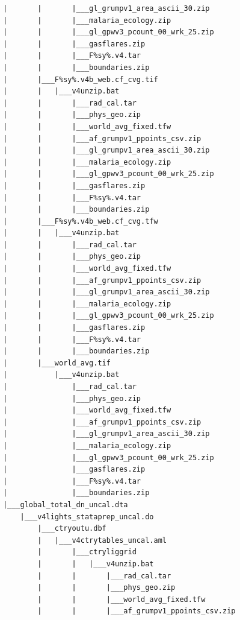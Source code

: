 \documentclass[
]{book}
\begin{document}
\begin{verbatim}
            |       |       |___gl_grumpv1_area_ascii_30.zip
            |       |       |___malaria_ecology.zip
            |       |       |___gl_gpwv3_pcount_00_wrk_25.zip
            |       |       |___gasflares.zip
            |       |       |___F%sy%.v4.tar
            |       |       |___boundaries.zip
            |       |___F%sy%.v4b_web.cf_cvg.tif
            |       |   |___v4unzip.bat
            |       |       |___rad_cal.tar
            |       |       |___phys_geo.zip
            |       |       |___world_avg_fixed.tfw
            |       |       |___af_grumpv1_ppoints_csv.zip
            |       |       |___gl_grumpv1_area_ascii_30.zip
            |       |       |___malaria_ecology.zip
            |       |       |___gl_gpwv3_pcount_00_wrk_25.zip
            |       |       |___gasflares.zip
            |       |       |___F%sy%.v4.tar
            |       |       |___boundaries.zip
            |       |___F%sy%.v4b_web.cf_cvg.tfw
            |       |   |___v4unzip.bat
            |       |       |___rad_cal.tar
            |       |       |___phys_geo.zip
            |       |       |___world_avg_fixed.tfw
            |       |       |___af_grumpv1_ppoints_csv.zip
            |       |       |___gl_grumpv1_area_ascii_30.zip
            |       |       |___malaria_ecology.zip
            |       |       |___gl_gpwv3_pcount_00_wrk_25.zip
            |       |       |___gasflares.zip
            |       |       |___F%sy%.v4.tar
            |       |       |___boundaries.zip
            |       |___world_avg.tif
            |           |___v4unzip.bat
            |               |___rad_cal.tar
            |               |___phys_geo.zip
            |               |___world_avg_fixed.tfw
            |               |___af_grumpv1_ppoints_csv.zip
            |               |___gl_grumpv1_area_ascii_30.zip
            |               |___malaria_ecology.zip
            |               |___gl_gpwv3_pcount_00_wrk_25.zip
            |               |___gasflares.zip
            |               |___F%sy%.v4.tar
            |               |___boundaries.zip
            |___global_total_dn_uncal.dta
                |___v4lights_stataprep_uncal.do
                    |___ctryoutu.dbf
                    |   |___v4ctrytables_uncal.aml
                    |       |___ctryliggrid
                    |       |   |___v4unzip.bat
                    |       |       |___rad_cal.tar
                    |       |       |___phys_geo.zip
                    |       |       |___world_avg_fixed.tfw
                    |       |       |___af_grumpv1_ppoints_csv.zip

\end{verbatim}
\end{document}
